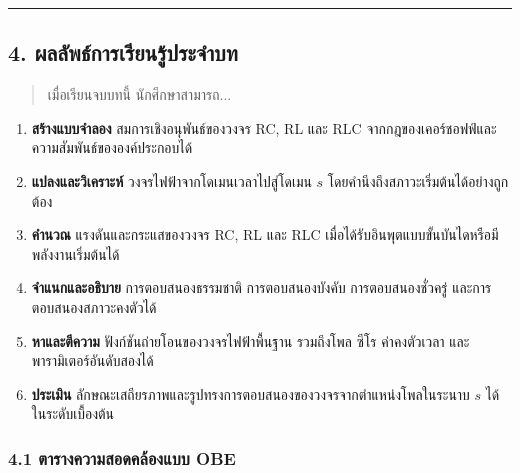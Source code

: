 \par\noindent\rule{\textwidth}{0.4pt}\par

\subsection{4. ผลลัพธ์การเรียนรู้ประจำบท}

\begin{quote}
เมื่อเรียนจบบทนี้ นักศึกษาสามารถ...
\end{quote}

\begin{enumerate}
    \item \textbf{สร้างแบบจำลอง} สมการเชิงอนุพันธ์ของวงจร RC, RL และ RLC จากกฎของเคอร์ชอฟฟ์และความสัมพันธ์ขององค์ประกอบได้
    \item \textbf{แปลงและวิเคราะห์} วงจรไฟฟ้าจากโดเมนเวลาไปสู่โดเมน $s$ โดยคำนึงถึงสภาวะเริ่มต้นได้อย่างถูกต้อง
    \item \textbf{คำนวณ} แรงดันและกระแสของวงจร RC, RL และ RLC เมื่อได้รับอินพุตแบบขั้นบันไดหรือมีพลังงานเริ่มต้นได้
    \item \textbf{จำแนกและอธิบาย} การตอบสนองธรรมชาติ การตอบสนองบังคับ การตอบสนองชั่วครู่ และการตอบสนองสภาวะคงตัวได้
    \item \textbf{หาและตีความ} ฟังก์ชันถ่ายโอนของวงจรไฟฟ้าพื้นฐาน รวมถึงโพล ซีโร ค่าคงตัวเวลา และพารามิเตอร์อันดับสองได้
    \item \textbf{ประเมิน} ลักษณะเสถียรภาพและรูปทรงการตอบสนองของวงจรจากตำแหน่งโพลในระนาบ $s$ ได้ในระดับเบื้องต้น
\end{enumerate}

\subsubsection{4.1 ตารางความสอดคล้องแบบ OBE}

